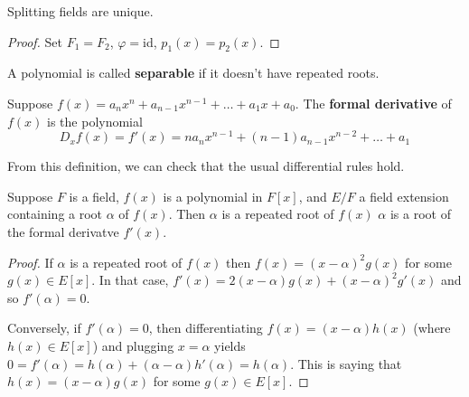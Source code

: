 \documentclass[12pt]{article}
\begin{document}
\begin{corollary}
    Splitting fields are unique.
    \begin{proof}
        Set $F_1=F_2$, $\varphi=$id, $p_1(x)=p_2(x)$.
    \end{proof}
\end{corollary}


 A polynomial is called \textbf{separable} if it doesn't have repeated roots.

 Suppose $f(x)=a_nx^n+a_{n-1}x^{n-1}+\dots + a_1x+a_0$. The \textbf{formal derivative} of $f(x)$ is the polynomial $$D_xf(x)=f'(x)=na_{n}x^{n-1}+(n-1)a_{n-1}x^{n-2}+\dots+a_1$$

From this definition, we can check that the usual differential rules hold.

\begin{lemma}
    Suppose $F$ is a field, $f(x)$ is a polynomial in $F[x]$, and $E/F$ a field extension containing a root $\alpha$ of $f(x)$. Then $\alpha$ is a repeated root of $f(x)$ \ifnif $\alpha$ is a root of the formal derivatve $f'(x)$. 

    \begin{proof}
        If $\alpha$ is a repeated root of $f(x)$ then $f(x)=(x-\alpha)^2g(x)$ for some $g(x)\in E[x]$. In that case, $f'(x)=2(x-\alpha)g(x)+(x-\alpha)^2g'(x)$ and so $f'(\alpha)=0$.

        Conversely, if $f'(\alpha)=0$, then differentiating $f(x)=(x-\alpha)h(x)$ (where $h(x)\in E[x]$) and plugging $x=\alpha$ yields $0=f'(\alpha)=h(\alpha)+(\alpha-\alpha)h'(\alpha)=h(\alpha)$. This is saying that $h(x)=(x-\alpha)g(x)$ for some $g(x)\in E[x]$.
    \end{proof}
\end{lemma}
\end{document}
